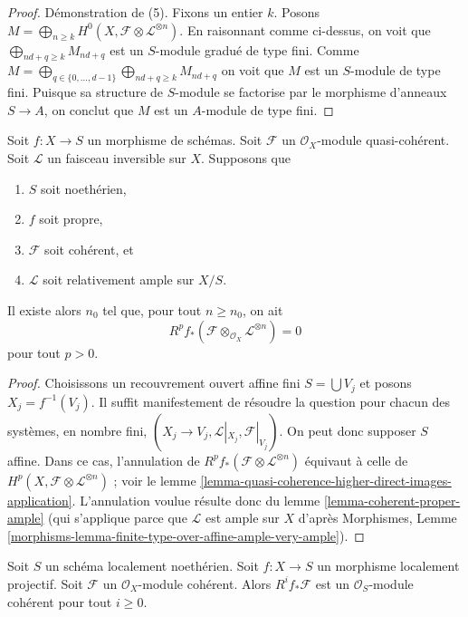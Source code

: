 \begin{proof}
\medskip\noindent
Démonstration de (5). Fixons un entier $k$. Posons
$M = \bigoplus_{n \geq k} H^0(X, \mathcal{F} \otimes \mathcal{L}^{\otimes n})$.
En raisonnant comme ci-dessus, on voit que $\bigoplus_{nd + q \geq k} M_{nd + q}$
est un $S$-module gradué de type fini. Comme
$M = \bigoplus_{q \in \{0, \ldots, d - 1\}}
\bigoplus_{nd + q \geq k} M_{nd + q}$
on voit que $M$ est un $S$-module de type fini. Puisque sa structure de $S$-module se
factorise par le morphisme d'anneaux $S \to A$, on conclut que $M$ est
un $A$-module de type fini.
\end{proof}

\begin{lemma}
\label{lemma-kill-by-twisting}
Soit $f : X \to S$ un morphisme de schémas.
Soit $\mathcal{F}$ un $\mathcal{O}_X$-module quasi-cohérent.
Soit $\mathcal{L}$ un faisceau inversible sur $X$.
Supposons que
\begin{enumerate}
\item $S$ soit noethérien,
\item $f$ soit propre,
\item $\mathcal{F}$ soit cohérent, et
\item $\mathcal{L}$ soit relativement ample sur $X/S$.
\end{enumerate}
Il existe alors $n_0$ tel que, pour tout $n \geq n_0$,
on ait
$$
R^pf_*\left(\mathcal{F} \otimes_{\mathcal{O}_X} \mathcal{L}^{\otimes n}\right)
=
0
$$
pour tout $p > 0$.
\end{lemma}

\begin{proof}
Choisissons un recouvrement ouvert affine fini $S = \bigcup V_j$ et
posons $X_j = f^{-1}(V_j)$.
Il suffit manifestement de résoudre la question pour chacun des systèmes, en nombre
fini, $(X_j \to V_j, \mathcal{L}|_{X_j}, \mathcal{F}|_{V_j})$.
On peut donc supposer $S$ affine. Dans
ce cas, l'annulation de
$R^pf_*(\mathcal{F} \otimes \mathcal{L}^{\otimes n})$
équivaut à celle de
$H^p(X, \mathcal{F} \otimes \mathcal{L}^{\otimes n})$ ; voir le
lemme \ref{lemma-quasi-coherence-higher-direct-images-application}.
L'annulation voulue résulte donc
du lemme \ref{lemma-coherent-proper-ample} (qui s'applique parce que
$\mathcal{L}$ est ample sur $X$ d'après Morphismes, Lemme
\ref{morphisms-lemma-finite-type-over-affine-ample-very-ample}).
\end{proof}

\begin{lemma}
\label{lemma-locally-projective-pushforward}
Soit $S$ un schéma localement noethérien.
Soit $f : X \to S$ un morphisme localement projectif.
Soit $\mathcal{F}$ un $\mathcal{O}_X$-module cohérent.
Alors $R^if_*\mathcal{F}$ est un $\mathcal{O}_S$-module
cohérent pour tout $i \geq 0$.
\end{lemma}

